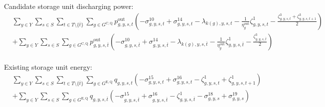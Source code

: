 \documentclass{article}
\newcommand{\sStorageExisting}{G^{\mathrm{E,Q}}}
\newcommand{\sStorageCandidate}{G^{\mathrm{C,Q}}}
\newcommand{\sYears}{Y}
\newcommand{\sScenarios}{S}
\newcommand{\sIntervals}{T}
\newcommand{\iGenerator}{g}
\newcommand{\iYear}{y}
\newcommand{\iScenario}{s}
\newcommand{\iInterval}{t}
\newcommand{\iIntervalTerminal}{\overline{\iInterval}}
\newcommand{\iZone}{z}
\newcommand{\cStorageUnitEfficiencyDischarging}{\eta_{\iGenerator}^{\mathrm{out}}}
\newcommand{\vPowerOut}[1][\iGenerator,\iYear,\iScenario,\iInterval]{p^{\mathrm{out}}_{#1}}
\newcommand{\vStorageUnitEnergy}[1][\iGenerator,\iYear,\iScenario,\iInterval]{q_{#1}}
\newcommand{\dNonNegativeDischarging}[1][\iGenerator,\iYear,\iScenario,\iInterval]{\sigma_{#1}^{10}}
\newcommand{\dMaxDischargingRateCandidate}[1][\iGenerator,\iYear,\iScenario,\iInterval]{\sigma_{#1}^{14}}
\newcommand{\dNonNegativeStorageEnergy}[1][\iGenerator,\iYear,\iScenario,\iInterval]{\sigma_{#1}^{15}}
\newcommand{\dMaxStorageEnergyExisting}[1][\iGenerator,\iYear,\iScenario,\iInterval]{\sigma_{#1}^{16}}
\newcommand{\dMinStorageEnergyIntervalEnd}[1][\iGenerator,\iYear,\iScenario]{\sigma_{#1}^{18}}
\newcommand{\dMaxStorageEnergyIntervalEnd}[1][\iGenerator,\iYear,\iScenario]{\sigma_{#1}^{19}}
\newcommand{\dPowerBalance}[1][\iZone,\iYear,\iScenario,\iInterval]{\lambda_{#1}}
\newcommand{\dStorageEnergyTransition}[1][\iGenerator,\iYear,\iScenario,\iInterval]{\zeta_{#1}^{1}}
\newcommand{\dStorageEnergyOutput}[1][\iGenerator,\iYear,\iScenario,\iInterval]{\zeta_{#1}^{3}}
\begin{document}
Candidate storage unit discharging power:
\begin{align}
	& \sum\limits_{\iYear \in \sYears}\sum\limits_{\iScenario \in \sScenarios} \sum\limits_{\iInterval \in \sIntervals \setminus \{\iIntervalTerminal\}} \sum\limits_{\iGenerator \in \sStorageCandidate} \vPowerOut \left( - \dNonNegativeDischarging + \dMaxDischargingRateCandidate - \dPowerBalance[k(\iGenerator),\iYear,\iScenario,\iInterval] - \frac{1}{\cStorageUnitEfficiencyDischarging} \dStorageEnergyTransition - \frac{\dStorageEnergyOutput + \dStorageEnergyOutput[\iGenerator,\iYear,\iScenario,\iInterval+1]}{2}\right) \nonumber\\
	& + \sum\limits_{\iYear \in \sYears}\sum\limits_{\iScenario \in \sScenarios} \sum\limits_{\iGenerator \in \sStorageCandidate} \vPowerOut[\iGenerator,\iYear,\iScenario,\iIntervalTerminal] \left( - \dNonNegativeDischarging[\iGenerator,\iYear,\iScenario,\iIntervalTerminal] + \dMaxDischargingRateCandidate[\iGenerator,\iYear,\iScenario,\iIntervalTerminal] - \dPowerBalance[k(\iGenerator),\iYear,\iScenario,\iIntervalTerminal] - \frac{1}{\cStorageUnitEfficiencyDischarging} \dStorageEnergyTransition[\iGenerator,\iYear,\iScenario,\iIntervalTerminal] - \frac{\dStorageEnergyOutput[\iGenerator,\iYear,\iScenario,\iIntervalTerminal]}{2}\right)\\\nonumber
\end{align}

Existing storage unit energy:
\begin{align}
	& \sum\limits_{\iYear \in \sYears}\sum\limits_{\iScenario \in \sScenarios} \sum\limits_{\iInterval \in \sIntervals \setminus \{\iIntervalTerminal\}} \sum\limits_{\iGenerator \in \sStorageExisting} \vStorageUnitEnergy \left(- \dNonNegativeStorageEnergy + \dMaxStorageEnergyExisting - \dStorageEnergyTransition + \dStorageEnergyTransition[\iGenerator,\iYear,\iScenario,\iInterval+1] \right)\\
	& + \sum\limits_{\iYear \in \sYears}\sum\limits_{\iScenario \in \sScenarios}\sum\limits_{\iGenerator \in \sStorageExisting} \vStorageUnitEnergy[\iGenerator,\iYear,\iScenario,\iIntervalTerminal] \left(- \dNonNegativeStorageEnergy[\iGenerator,\iYear,\iScenario,\iIntervalTerminal] + \dMaxStorageEnergyExisting[\iGenerator,\iYear,\iScenario,\iIntervalTerminal] - \dStorageEnergyTransition[\iGenerator,\iYear,\iScenario,\iIntervalTerminal] - \dMinStorageEnergyIntervalEnd + \dMaxStorageEnergyIntervalEnd \right)\\
\end{align}
\end{document}
